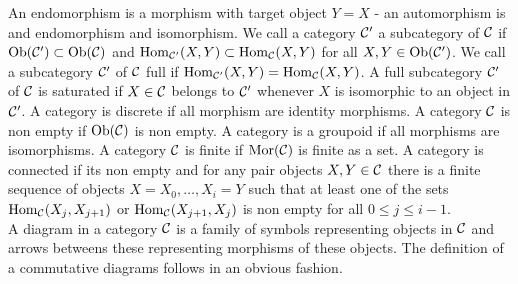 An endomorphism is a morphism with target object $Y = X$ - an automorphism is and endomorphism and isomorphism.
We call a category $\mathcal{C}'$ a subcategory of $\mathcal{C}$ if $\mathrm{Ob}(\mathcal{C}') \subset \mathrm{Ob}(\mathcal{C})$ and $\mathrm{Hom}_{\mathcal{C}'}(X,Y) \subset \mathrm{Hom}_{\mathcal{C}}(X,Y)$ for all $X, Y \in \mathrm{Ob}(\mathcal{C}')$. We call a subcategory $\mathcal{C}'$ of $\mathcal{C}$ full if $\mathrm{Hom}_{\mathcal{C}'}(X,Y) = \mathrm{Hom}_{\mathcal{C}}(X,Y)$. A full subcategory $\mathcal{C}'$ of $\mathcal{C}$ is saturated if $X \in \mathcal{C}$ belongs to $\mathcal{C}'$ whenever $X$ is isomorphic to an object in $\mathcal{C}'$. A category is discrete if all morphism are identity morphisms. A category $\mathcal{C}$ is non empty if $\mathrm{Ob}(\mathcal{C})$ is non empty. A category is a groupoid if all morphisms are isomorphisms. A category $\mathcal{C}$ is finite if $\mathrm{Mor}(\mathcal{C})$ is finite as a set. A category is connected if its non empty and for any pair objects $X, Y \in \mathcal{C}$ there is a finite sequence of objects $X = X_0, \ldots, X_i = Y$ such that at least one of the sets $\mathrm{Hom}_{\mathcal{C}}(X_j,X_{j+1})$ or $\mathrm{Hom}_{\mathcal{C}}(X_{j+1},X_j)$ is non empty for all $0 \leq j \leq i - 1$.\\
\indent A diagram in a category $\mathcal{C}$ is a family of symbols representing objects in $\mathcal{C}$ and arrows betweens these representing morphisms of these objects. The definition of a commutative diagrams follows in an obvious fashion.
\bsp 
